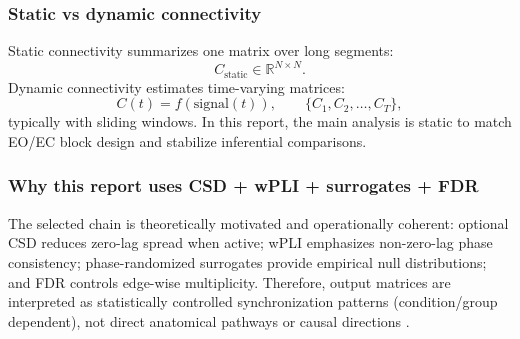 \subsubsection{Static vs dynamic connectivity}

Static connectivity summarizes one matrix over long segments:
\[
C_{\text{static}} \in \mathbb{R}^{N\times N}.
\]
Dynamic connectivity estimates time-varying matrices:
\[
C(t)=f(\text{signal}(t)),\qquad \{C_1,C_2,\dots,C_T\},
\]
typically with sliding windows. In this report, the main analysis is static to match EO/EC block design and stabilize inferential comparisons.

\subsubsection{Why this report uses CSD + wPLI + surrogates + FDR}

The selected chain is theoretically motivated and operationally coherent: optional CSD reduces zero-lag spread when active; wPLI emphasizes non-zero-lag phase consistency; phase-randomized surrogates provide empirical null distributions; and FDR controls edge-wise multiplicity. Therefore, output matrices are interpreted as statistically controlled synchronization patterns (condition/group dependent), not direct anatomical pathways or causal directions \citep{Cohen2014,Blinowska-Cieslak2022,Vinck2011WPLI,Cao2022EEGConnectivity}.
